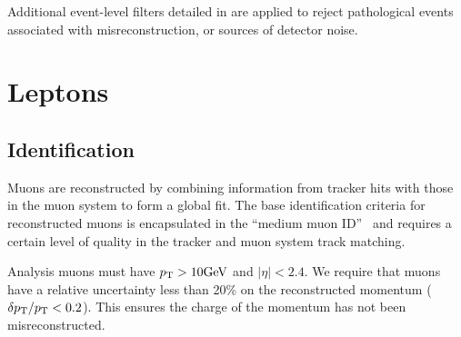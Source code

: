 Additional event-level filters detailed in \cite{CMS:JetMETFilters} are applied 
to reject pathological events associated with misreconstruction, or sources of 
detector noise.

\section{Leptons}

\subsection{Identification}

Muons are reconstructed by combining information from tracker hits
with those in the muon system to form a global fit.
The base identification criteria for reconstructed muons is encapsulated in the 
``medium muon ID''~\cite{CMS:Sirunyan2019yvv} and requires
a certain level of quality in the tracker and muon system track matching.

Analysis muons must have $p_{\mathrm{T}}>10\text{GeV}$ and $|\eta|<2.4$. 
We require that muons have a relative 
uncertainty less than 20\% on the reconstructed momentum ($\delta p_{\mathrm{T}}/p_{\mathrm{T}}<0.2$).
This ensures the charge of the momentum has not been misreconstructed.

